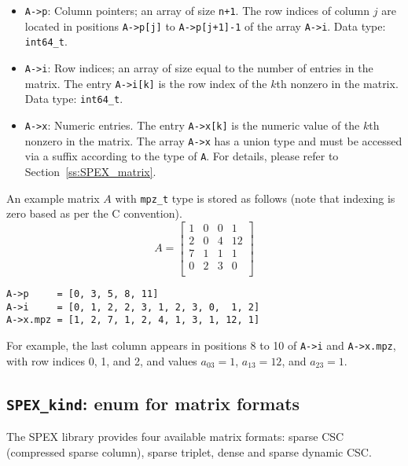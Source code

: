 \documentclass[12pt,oneside]{book}
\theoremstyle{definition}
\begin{document}
\begin{itemize}
    \item \verb|A->p|: Column pointers; an array of size \verb|n+1|. The row indices of column $j$ are located in positions \verb|A->p[j]| to \verb|A->p[j+1]-1| of the array \verb|A->i|. Data type: \verb|int64_t|.

    \item \verb|A->i|: Row indices; an array of size equal to the number of entries in the matrix. The entry \verb|A->i[k]| is the row index of the $k$th nonzero in the matrix. Data type: \verb|int64_t|.

    \item \verb|A->x|: Numeric entries. The entry \verb|A->x[k]| is the numeric value of the $k$th nonzero in the matrix.  The array \verb|A->x| has a union type and must be accessed via a suffix according to the type of \verb|A|.  For details, please refer to Section~\ref{ss:SPEX_matrix}.
\end{itemize}

An example matrix $A$ with \verb|mpz_t| type is stored as follows (note that indexing is zero based as per the C convention).
\[A = \begin{bmatrix}
    1 & 0 & 0 & 1 \\
    2 & 0 & 4 & 12 \\
    7 & 1 & 1 & 1 \\
    0 & 2 & 3 & 0 \\
\end{bmatrix}\]

\begin{verbatim}
A->p     = [0, 3, 5, 8, 11]
A->i     = [0, 1, 2, 2, 3, 1, 2, 3, 0,  1, 2]
A->x.mpz = [1, 2, 7, 1, 2, 4, 1, 3, 1, 12, 1]
\end{verbatim}

For example, the last column appears in positions 8 to 10 of \verb|A->i| and \verb|A->x.mpz|, with row indices 0, 1, and 2, and values $a_{03}=1$, $a_{13}=12$, and $a_{23}=1$.


\subsection{\texttt{SPEX\_kind}: enum for matrix formats} \label{ss:SPEX_kind}
The SPEX library provides four available matrix formats: sparse CSC
(compressed sparse column), sparse triplet, dense and sparse dynamic CSC.
\end{document}
